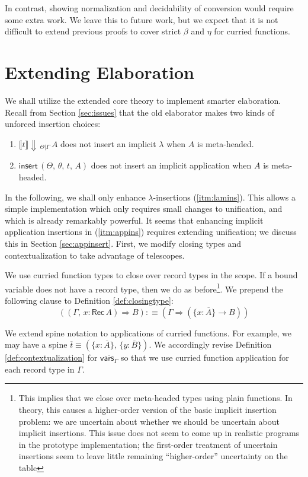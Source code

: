 \documentclass[acmsmall,review,anonymous,prologue,dvipsnames]{acmart}\settopmatter{printfolios=true,printccs=false,printacmref=false}
\newcommand{\To}{\Rightarrow}
\newcommand{\echeck}[4]{\llbracket#1\rrbracket\!\Downarrow\,_{#2|#3}\,#4}
\newcommand{\einsert}{\mathsf{insert}}
\newcommand{\Rec}{\mathsf{Rec}}
\newcommand{\ol}[1]{\overline{#1}}
\theoremstyle{remark}
\begin{document}
In contrast, showing normalization and decidability of conversion would require
some extra work. We leave this to future work, but we expect that it is not
difficult to extend previous proofs to cover strict $\beta$ and $\eta$ for
curried functions.

\section{Extending Elaboration}
\label{sec:extending_elaboration}

We shall utilize the extended core theory to implement smarter
elaboration. Recall from Section \ref{sec:issues} that the old elaborator makes
two kinds of unforced insertion choices:
\begin{enumerate}
\item\label{itm:lamins} $\echeck{t}{\Theta}{\Gamma}{A}$ does not insert an implicit $\lambda$ when $A$ is meta-headed.
\item\label{itm:appins} $\einsert\,(\Theta,\,\theta,\,t,\,A)$ does not insert an implicit application when $A$ is meta-headed.
\end{enumerate}
In the following, we shall only enhance $\lambda$-insertions
(\ref{itm:lamins}). This allows a simple implementation which only requires
small changes to unification, and which is already remarkably powerful. It
seems that enhancing implicit application insertions in (\ref{itm:appins})
requires extending unification; we discuss this in Section
\ref{sec:appinsert}. First, we modify closing types and contextualization to
take advantage of telescopes.

\begin{definition}
We use curried function types to close over record types in the scope. If a
bound variable does not have a record type, then we do as before\footnote{This
  implies that we close over meta-headed types using plain functions. In theory,
  this causes a higher-order version of the basic implicit insertion problem: we
  are uncertain about whether we should be uncertain about implicit
  insertions. This issue does not seem to come up in realistic programs in the prototype implementation; the first-order treatment of uncertain insertions seem to leave little remaining ``higher-order'' uncertainty on the table }. We prepend the
following clause to Definition
\ref{def:closingtype}:
\[
  ((\Gamma,\, x : \Rec\,A) \To B) :\equiv (\Gamma \To (\{x : \ol{A}\} \to B))
\]
\end{definition}
\begin{definition}[Contextualization]
We extend spine notation to applications of curried functions. For example, we
may have a spine $\ol{t} \equiv (\{x : \ol{A}\},\,\{y : \ol{B}\})$. We
accordingly revise Definition \ref{def:contextualization} for
$\overline{\mathsf{vars}_{\Gamma}}$ so that we use curried function application
for each record type in $\Gamma$.
\end{definition}
\end{document}
